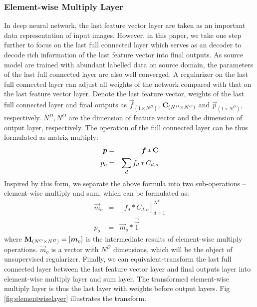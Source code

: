 \documentclass[runningheads]{llncs}
\begin{document}
\subsubsection{Element-wise Multiply Layer}
\label{section:Element-wise Multiply Layer}
In deep neural network, the last feature vector layer are taken as an important data representation of input images. However, in this paper, we take one step further to focus on the last full connected layer which serves as an decoder to decode rich information of the last feature vector into final outputs. As source model are trained with abundant labelled data on source domain, the parameters of the last full connected layer are also well converged. A regularizer on the last full connected layer can adjust all weights of the network compared with that on the last feature vector layer. Denote the last feature vector, weights of the last full connected layer and final outputs as $\vec{f}_{(1\times N^{D})}$, ${\bf C}_{(N^{D}\times N^{O})}$ and $\vec{p}_{(1\times N^{O})}$, respectively. $ N^{D}, N^{O}$ are the dimension of feature vector and the dimension of output layer, respectively. The operation of the full connected layer can be thus formulated as matrix multiply:
\begin{eqnarray}
  \vec{p} &=& \vec{f}*{\bf C} \\
  p_{o} &=&  \sum_{d}{f_{d}*C_{d,o}}
\end{eqnarray}
Inspired by this form, we separate the above formula into two sub-operations -- element-wise multiply and sum, which can be formulated as:
\begin{eqnarray}
  \vec{m}_{o} &=& [f_{d} * C_{d,o}]^{N^{D}}_{d=1} \\
  p_{o} &=& \vec{m}_{o}*\vec{\overrightarrow{1}}
\end{eqnarray}
where ${\bf M}_{(N^{O}\times N^{D})} = [\vec{m}_{o}]$ is the intermediate results of element-wise multiply operations. $\vec{m}_{o}$ is a vector with $N^{D}$ dimensions, which will be the object of unsupervised regularizer. Finally, we can equivalent-transform the last full connected layer between the last feature vector layer and final outputs layer into element-wise multiply layer and sum layer. The transformed element-wise multiply layer is thus the last layer with weights before output layers. Fig \ref{fig:elementwiselayer} illustrates the transform.
\end{document}
